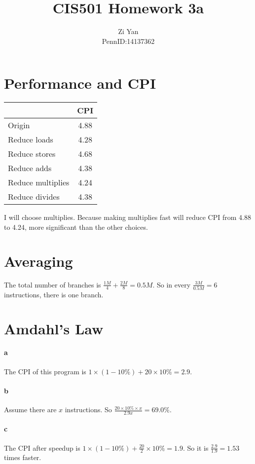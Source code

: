 \documentclass[12pt,letterpaper]{article}
\author{Zi Yan\\PennID:14137362}
\title{CIS501 Homework 3a}
\date{}
\begin{document}
\maketitle

\section{Performance and CPI}
\begin{tabular}{|l|c|}
\hline 
  & CPI \\ 
\hline 
Origin & 4.88 \\ 
\hline 
Reduce loads & 4.28 \\ 
\hline 
Reduce stores & 4.68 \\ 
\hline 
Reduce adds & 4.38 \\ 
\hline 
Reduce multiplies & 4.24 \\ 
\hline 
Reduce divides & 4.38 \\ 
\hline 
\end{tabular} 

I will choose multiplies. Because making multiplies fast will reduce CPI
from 4.88 to 4.24, more significant than the other choices.

\section{Averaging}
The total number of branches is $\frac{1M}{4}+\frac{2M}{8} = 0.5M$.
So in every $\frac{3M}{0.5M} = 6$ instructions, there is one branch.

\section{Amdahl's Law}
\paragraph*{a}
The CPI of this program is $1 \times (1-10\%) + 20 \times 10\% = 2.9$.

\paragraph*{b}
Assume there are $x$ instructions. So $\frac{20\times10\%\times x}{2.9x}
=69.0\%$.

\paragraph*{c}
The CPI after speedup is $1\times (1-10\%) + \frac{20}{2}\times 10\% = 1.9$.
So it is $\frac{2.9}{1.9}=1.53$ times faster.
\end{document}
